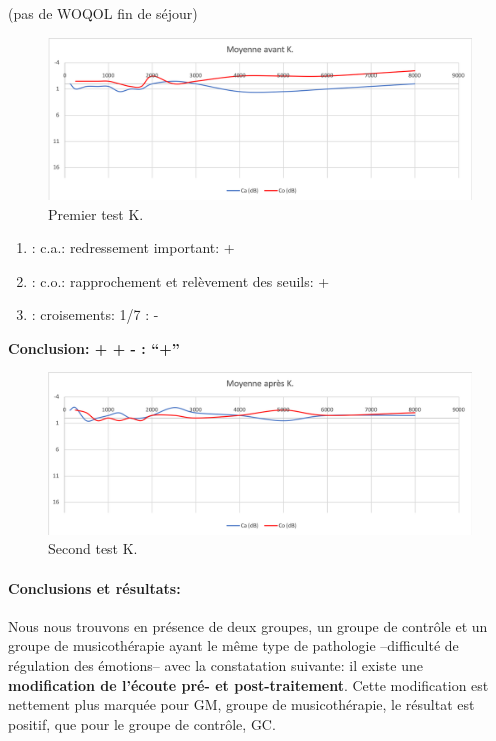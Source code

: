   (pas de WOQOL fin de séjour)

        \begin{figure}
\centering
\includegraphics[width=0.7\linewidth]{images/graphiques/kad_pre.png}
\caption[Moyenne OG+OD]{Premier test K.}

\end{figure}
	\begin{enumerate}

 		\item : c.a.: redressement important: +

 		\item : c.o.: rapprochement et relèvement des seuils: +
 		\item : croisements: 1/7 :  -

                \end{enumerate}

                \textbf{  Conclusion:  + + -       : ``+''}

                 \begin{figure}
\centering
\includegraphics[width=0.7\linewidth]{images/graphiques/kad_post.png}
\caption[Moyenne OG+OD]{Second test K.}

\end{figure}

\paragraph{ Conclusions et résultats:}

             Nous nous trouvons
           en présence de deux groupes, un groupe de contrôle et un
           groupe de musicothérapie ayant le même type de
           pathologie --difficulté de régulation des émotions-- avec la constatation suivante: il existe
          une \textbf{modification de l'écoute pré- et post-traitement}.
          Cette modification est nettement plus marquée
          pour GM, groupe de musicothérapie, le résultat est positif, que pour le groupe de contrôle, GC.

